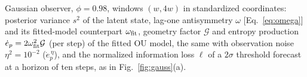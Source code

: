 \begin{table}[t]
\squeezetable
\caption{Gaussian observer, $\phi=0.98$, windows $(w,4w)$ in standardized coordinates: posterior variance $s^2$ of the latent state, lag-one antisymmetry $\omega$ [Eq.~\eqref{eq:omega}] and its fitted-model counterpart $\omega_{\rm fit}$, geometry factor $\mathcal G$ and entropy production $\dot e_p=2\omega_{\rm fit}^2\mathcal G$ (per step) of the fitted OU model, the same with observation noise $\eta^2=10^{-2}$ ($\dot e_p^{\,\eta}$), and the normalized information loss $\ell$ of a $2\sigma$ threshold forecast at a horizon of ten steps, as in Fig.~\ref{fig:gauss}(a).}
\label{tab:gauss}

\end{table}

